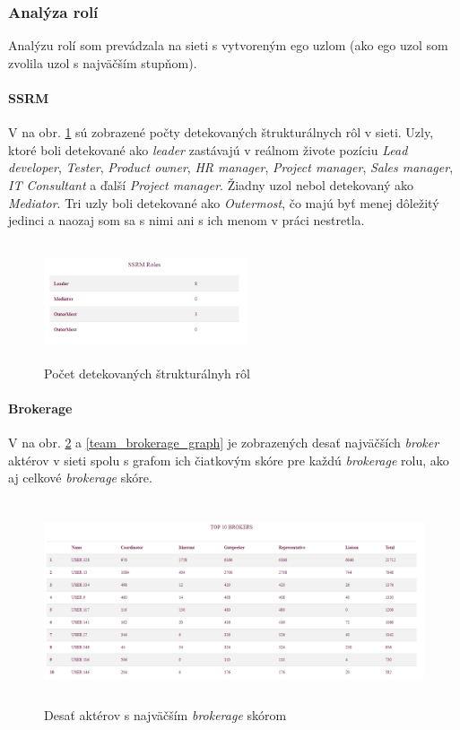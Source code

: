 \documentclass[slovak,master,public,dept460,male,cpdeclaration,oneside]{diploma}
\begin{document}
\subsubsection{Analýza rolí}

Analýzu rolí som prevádzala na sieti s vytvoreným ego uzlom (ako ego uzol som zvolila uzol s najväčším stupňom). 

\paragraph{SSRM}
\hfill \break
V na obr. \ref{team_ssrm} sú zobrazené počty detekovaných štrukturálnych rôl v sieti. Uzly, ktoré boli detekované ako \textit{leader} zastávajú v reálnom živote pozíciu \textit{Lead developer}, \textit{Tester}, \textit{Product owner}, \textit{HR manager}, \textit{Project manager}, \textit{Sales manager}, \textit{IT Consultant} a ďalší \textit{Project manager}. Žiadny uzol nebol detekovaný ako \textit{Mediator}. Tri uzly boli detekované ako \textit{Outermost}, čo majú byť menej dôležitý jedinci a naozaj som sa s nimi ani s ich menom v práci nestretla.

\begin{figure}[H]
\centering
\includegraphics[width=6cm, height=3.5cm]{figures/team_ssrm}
\caption{Počet detekovaných štrukturálnyh rôl}
\label{team_ssrm}
\end{figure}


\paragraph{Brokerage}
\hfill \break
V na obr. \ref{team_brokerage_tab} a \ref{team_brokerage_graph} je zobrazených desať najväčších \textit{broker} aktérov v sieti spolu s grafom ich čiatkovým skóre pre každú \textit{brokerage} rolu, ako aj celkové \textit{brokerage} skóre.


\begin{figure}[H]
\centering
\includegraphics[width=15cm, height=6cm]{figures/team_brokerage_tab}
\caption{Desať aktérov s najväčším \textit{brokerage} skórom}
\label{team_brokerage_tab}
\end{figure}
\end{document}
